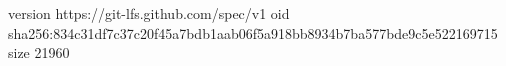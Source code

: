 version https://git-lfs.github.com/spec/v1
oid sha256:834c31df7c37c20f45a7bdb1aab06f5a918bb8934b7ba577bde9c5e522169715
size 21960
